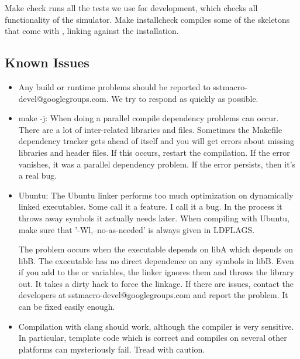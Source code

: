 Make check runs all the tests we use for development, which checks all functionality of the simulator.  
Make installcheck compiles some of the skeletons that come with \sstmacro, linking against the installation.  


\subsection{Known Issues}
\label{subsec:build:issues}


\begin{itemize}
\item Any build or runtime problems should be reported to sstmacro-devel@googlegroups.com.  We try to respond as quickly as possible.
\item make -j: When doing a parallel compile dependency problems can occur.  
There are a lot of inter-related libraries and files.  
Sometimes the Makefile dependency tracker gets ahead of itself and you will get errors about missing libraries and header files.
If this occurs, restart the compilation.  If the error vanishes, it was a parallel dependency problem.
If the error persists, then it's a real bug.

\item Ubuntu: The Ubuntu linker performs too much optimization on dynamically linked executables.
Some call it a feature.  I call it a bug.
In the process it throws away symbols it actually needs later.
When compiling with Ubuntu, make sure that '-Wl,--no-as-needed' is always given in LDFLAGS.

The problem occurs when the executable depends on libA which depends on libB.
The executable has no direct dependence on any symbols in libB.
Even if you add  to the  or  variables,
the linker ignores them and throws the library out.
It takes a dirty hack to force the linkage.
If there are issues, contact the developers at sstmacro-devel@googlegroups.com and report the problem. 
It can be fixed easily enough.

\item Compilation with clang should work, although the compiler is very sensitive.  
In particular, template code which is correct and compiles on several other platforms can mysteriously fail.  Tread with caution.
\end{itemize}

